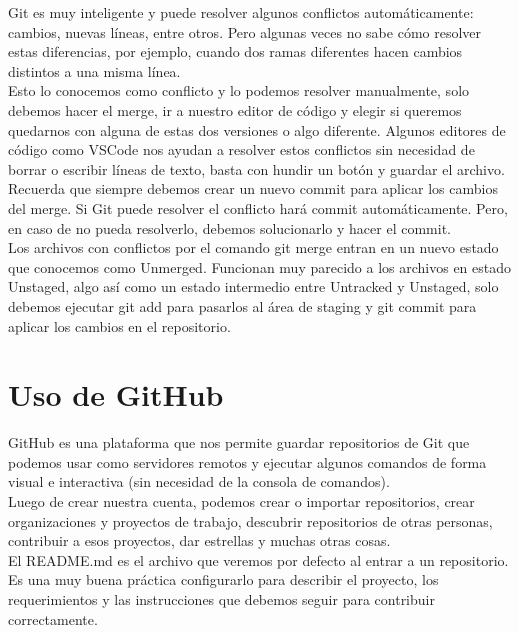 \documentclass{article}
\begin{document}
Git es muy inteligente y puede resolver algunos conflictos automáticamente:
cambios, nuevas líneas, entre otros. Pero algunas veces no sabe cómo resolver
estas diferencias, por ejemplo, cuando dos ramas diferentes hacen cambios
distintos a una misma línea.\\

Esto lo conocemos como conflicto y lo podemos resolver manualmente, solo
debemos hacer el merge, ir a nuestro editor de código y elegir si queremos
quedarnos con alguna de estas dos versiones o algo diferente. Algunos editores
de código como VSCode nos ayudan a resolver estos conflictos sin necesidad de
borrar o escribir líneas de texto, basta con hundir un botón y guardar el
archivo.\\

Recuerda que siempre debemos crear un nuevo commit para aplicar los cambios del
merge. Si Git puede resolver el conflicto hará commit automáticamente. Pero, en
caso de no pueda resolverlo, debemos solucionarlo y hacer el commit.\\

Los archivos con conflictos por el comando git merge entran en un nuevo estado
que conocemos como Unmerged. Funcionan muy parecido a los archivos en estado
Unstaged, algo así como un estado intermedio entre Untracked y Unstaged, solo
debemos ejecutar git add para pasarlos al área de staging y git commit para
aplicar los cambios en el repositorio.\\


\section{Uso de GitHub}%
GitHub es una plataforma que nos permite guardar repositorios de Git que
podemos usar como servidores remotos y ejecutar algunos comandos de forma
visual e interactiva (sin necesidad de la consola de comandos).\\

Luego de crear nuestra cuenta, podemos crear o importar repositorios, crear
organizaciones y proyectos de trabajo, descubrir repositorios de otras
personas, contribuir a esos proyectos, dar estrellas y muchas otras cosas.\\

El README.md es el archivo que veremos por defecto al entrar a un repositorio.
Es una muy buena práctica configurarlo para describir el proyecto, los
requerimientos y las instrucciones que debemos seguir para contribuir
correctamente.\\
\end{document}
